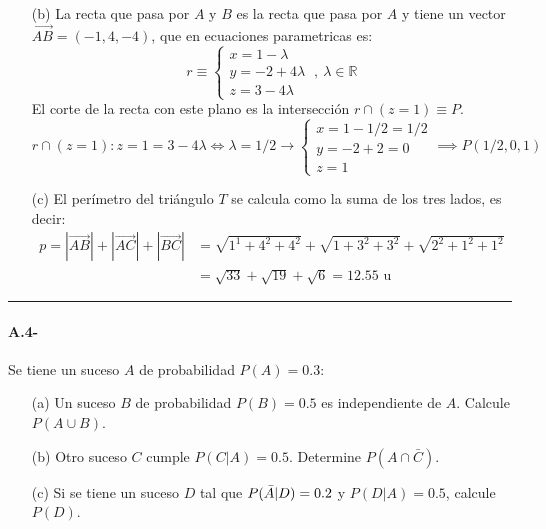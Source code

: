 \begin{enumerate}
    \item[(b)] La recta que pasa por $A$ y $B$ es la recta que pasa por $A$ y tiene un vector $\Vec{AB}=(-1,4,-4)$, que en ecuaciones parametricas es:
    $$
    r\equiv \begin{cases}
        x=1-\lambda \\
        y=-2+4\lambda \\
        z=3-4\lambda 
    \end{cases} \ , \ \lambda \in \mathbb{R}
    $$
    El corte de la recta con este plano es la intersección $r \cap (z=1)\equiv P$.
    $$
    r\cap (z=1) : z=1=3-4\lambda \iff \boxed{\lambda =1/2} \rightarrow \begin{cases}
        x=1-1/2=1/2\\
        y=-2+2=0\\
        z=1
    \end{cases}\implies \boxed{P(1/2,0,1)}
    $$

    \item[(c)] El perímetro del triángulo $T$ se calcula como la suma de los tres lados, es decir:
    \begin{equation*}
        \begin{split}
            p=|\Vec{AB}|+|\Vec{AC}|+|\Vec{BC}|&=\sqrt{1^1+4^2+4^2}+\sqrt{1+3^2+3^2}+\sqrt{2^2+1^2+1^2}\\
                                              &=\sqrt{33}+\sqrt{19}+\sqrt{6} =\boxed{12.55 \text{ u}} 
        \end{split}
    \end{equation*}
\end{enumerate}

\noindent\rule{\textwidth}{0.5pt}
\begin{mybox}
    \paragraph{A.4-} Se tiene un suceso $A$ de probabilidad $P(A) = 0.3$:
    \begin{enumerate}
        \item[(a)] Un suceso $B$ de probabilidad $P(B) = 0.5$ es independiente de $A$. Calcule $P(A \cup B)$. 
        \item[(b)] Otro suceso $C$ cumple $P(C | A) = 0.5$. Determine $P(A \cap \bar{C})$. 
        \item[(c)] Si se tiene un suceso $D$ tal que $P(\Bar{A} | D) = 0.2$ y $P(D | A) = 0.5$, calcule $P(D)$. 
    \end{enumerate}
\end{mybox}
